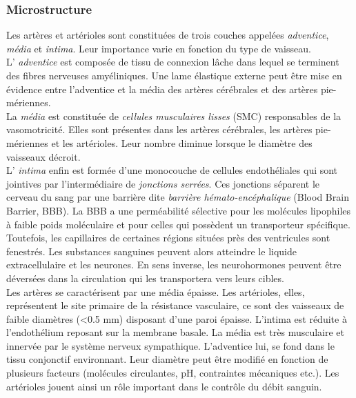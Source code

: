 \subsubsection{Microstructure}

Les artères et artérioles sont constituées de trois couches appelées {\em adventice},  {\em média} et  {\em intima}. Leur importance varie en fonction du type de vaisseau.\\
L’ {\em adventice} est composée de tissu de connexion lâche dans lequel se terminent des fibres nerveuses amyéliniques. Une lame élastique externe peut être mise en évidence entre l’adventice et la média des artères cérébrales et des artères pie-mériennes.\\
La  {\em média} est constituée de  {\em cellules musculaires lisses} (SMC) responsables de la vasomotricité. Elles sont présentes dans les artères cérébrales, les artères pie-mériennes et les artérioles. Leur nombre diminue lorsque le diamètre des vaisseaux décroit.\\
L’ {\em intima} enfin est formée d’une monocouche de cellules endothéliales qui sont jointives par l’intermédiaire de  {\em jonctions serrées}. Ces jonctions séparent le cerveau du sang par une barrière dite  {\em barrière hémato-encéphalique} (Blood Brain Barrier, BBB). La BBB a une perméabilité sélective pour les molécules lipophiles à faible poids moléculaire et pour celles qui possèdent un transporteur spécifique. Toutefois, les capillaires de certaines régions situées près des ventricules sont fenestrés. Les substances sanguines peuvent alors atteindre le liquide extracellulaire et les neurones. En sens inverse, les neurohormones peuvent être déversées dans la circulation qui les transportera vers leurs cibles.\\
Les artères se caractérisent par une média épaisse. Les artérioles, elles, représentent le site primaire de la résistance vasculaire, ce sont des vaisseaux de faible diamètres (<0.5 mm) disposant d’une paroi épaisse. L’intima est réduite à l’endothélium reposant sur la membrane basale. La média est très musculaire et innervée par le système nerveux sympathique. L’adventice lui, se fond dans le tissu conjonctif environnant. Leur diamètre peut être modifié en fonction de plusieurs facteurs (molécules circulantes, pH, contraintes mécaniques etc.). Les artérioles jouent ainsi un rôle important dans le contrôle du débit sanguin.\\
